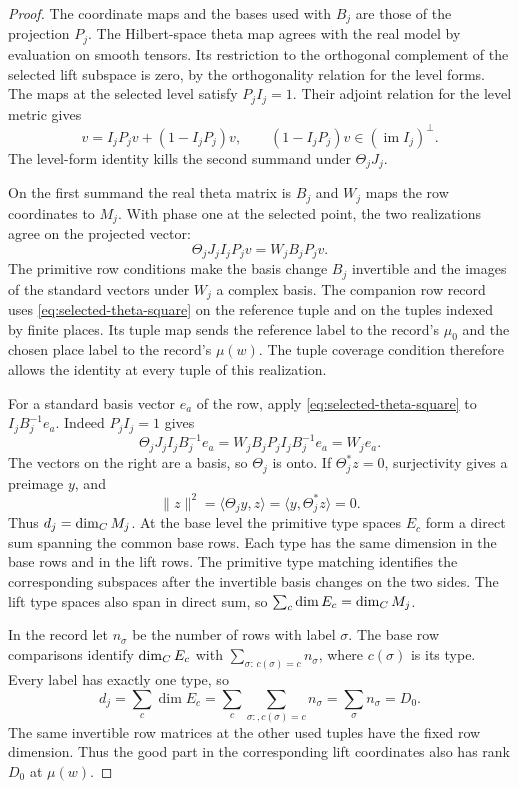 \begin{proof}
The coordinate maps and the bases used with \(B_j\) are those
of the projection \(P_j\). The Hilbert-space theta map
agrees with the real model by evaluation on smooth tensors.
Its restriction to the orthogonal complement of the selected
lift subspace is zero, by the orthogonality relation for the
level forms. The maps at the selected level satisfy \(P_jI_j=1\).
Their adjoint relation for the level metric gives
\[
 v=I_jP_jv+(1-I_jP_j)v,\qquad
 (1-I_jP_j)v\in (\operatorname{im}I_j)^\perp .
\]
The level-form identity kills the second summand under
\(\Theta_jJ_j\).

On the first summand the real theta matrix
is \(B_j\) and \(W_j\) maps the row coordinates to \(M_j\).
With phase one at the selected point, the two realizations agree on the projected vector:
\[
 \Theta_jJ_jI_jP_jv=W_jB_jP_jv .
\] The primitive row conditions make the basis
change \(B_j\) invertible and the images of the standard
vectors under \(W_j\) a complex basis. The companion row
record uses \eqref{eq:selected-theta-square} on the reference
tuple and on the tuples indexed by finite places. Its tuple
map sends the reference label to the record's \(\mu_0\) and
the chosen place label to the record's \(\mu(w)\). The tuple
coverage condition therefore allows the identity at every
tuple of this realization.
\label{cor:selected-period-2}

For a standard basis vector \(e_a\) of the row, apply
\eqref{eq:selected-theta-square} to \(I_j B_j^{-1}e_a\).
Indeed \(P_j I_j=1\) gives
\[
 \Theta_j J_j I_j B_j^{-1}e_a
       =W_j B_j P_jI_j B_j^{-1}e_a=W_j e_a .
\]
The vectors on the right are a basis, so \(\Theta_j\) is onto.
If \(\Theta_j^* z=0\), surjectivity gives a preimage \(y\), and
\[
 \|z\|^2=\langle\Theta_j y,z\rangle
        =\langle y,\Theta_j^*z\rangle=0 .
\]
Thus \(d_j=\dim_C M_j\). At the base level the primitive
type spaces \(E_c\) form a direct sum spanning the common
base rows. Each type has the same dimension in the base
rows and in the lift rows. The primitive type matching
identifies the corresponding subspaces after the invertible
basis changes on the two sides. The lift type spaces also
span in direct sum, so \(\sum_c\dim E_c=\dim_C M_j\).

In the record let \(n_\sigma\) be the number
of rows with label \(\sigma\). The base row comparisons
identify \(\dim_C E_c\) with
\(\sum_{\sigma:\,c(\sigma)=c}n_\sigma\), where \(c(\sigma)\)
is its type. Every label has exactly one type, so
\[
 d_j=\sum_c\dim E_c=\sum_c\sum_{\sigma:,c(\sigma)=c}n_\sigma
                     =\sum_\sigma n_\sigma=D_0 .
\] The same invertible row
matrices at the other used tuples have the fixed row
dimension. Thus the good part in the corresponding
lift coordinates also has rank \(D_0\) at \(\mu(w)\).
\end{proof}

